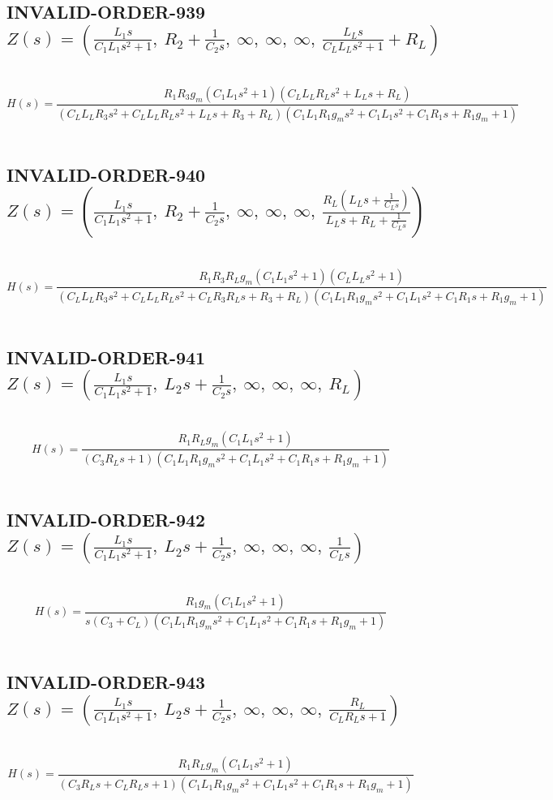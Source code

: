 \documentclass{article}
\begin{document}
\subsection{INVALID-ORDER-939 $Z(s) = \left( \frac{L_{1} s}{C_{1} L_{1} s^{2} + 1}, \  R_{2} + \frac{1}{C_{2} s}, \  \infty, \  \infty, \  \infty, \  \frac{L_{L} s}{C_{L} L_{L} s^{2} + 1} + R_{L}\right)$ } \ 
\textbf{\[H(s) = \frac{R_{1} R_{3} g_{m} \left(C_{1} L_{1} s^{2} + 1\right) \left(C_{L} L_{L} R_{L} s^{2} + L_{L} s + R_{L}\right)}{\left(C_{L} L_{L} R_{3} s^{2} + C_{L} L_{L} R_{L} s^{2} + L_{L} s + R_{3} + R_{L}\right) \left(C_{1} L_{1} R_{1} g_{m} s^{2} + C_{1} L_{1} s^{2} + C_{1} R_{1} s + R_{1} g_{m} + 1\right)}\] } \ 
\subsection{INVALID-ORDER-940 $Z(s) = \left( \frac{L_{1} s}{C_{1} L_{1} s^{2} + 1}, \  R_{2} + \frac{1}{C_{2} s}, \  \infty, \  \infty, \  \infty, \  \frac{R_{L} \left(L_{L} s + \frac{1}{C_{L} s}\right)}{L_{L} s + R_{L} + \frac{1}{C_{L} s}}\right)$ } \ 
\textbf{\[H(s) = \frac{R_{1} R_{3} R_{L} g_{m} \left(C_{1} L_{1} s^{2} + 1\right) \left(C_{L} L_{L} s^{2} + 1\right)}{\left(C_{L} L_{L} R_{3} s^{2} + C_{L} L_{L} R_{L} s^{2} + C_{L} R_{3} R_{L} s + R_{3} + R_{L}\right) \left(C_{1} L_{1} R_{1} g_{m} s^{2} + C_{1} L_{1} s^{2} + C_{1} R_{1} s + R_{1} g_{m} + 1\right)}\] } \ 
\subsection{INVALID-ORDER-941 $Z(s) = \left( \frac{L_{1} s}{C_{1} L_{1} s^{2} + 1}, \  L_{2} s + \frac{1}{C_{2} s}, \  \infty, \  \infty, \  \infty, \  R_{L}\right)$ } \ 
\textbf{\[H(s) = \frac{R_{1} R_{L} g_{m} \left(C_{1} L_{1} s^{2} + 1\right)}{\left(C_{3} R_{L} s + 1\right) \left(C_{1} L_{1} R_{1} g_{m} s^{2} + C_{1} L_{1} s^{2} + C_{1} R_{1} s + R_{1} g_{m} + 1\right)}\] } \ 
\subsection{INVALID-ORDER-942 $Z(s) = \left( \frac{L_{1} s}{C_{1} L_{1} s^{2} + 1}, \  L_{2} s + \frac{1}{C_{2} s}, \  \infty, \  \infty, \  \infty, \  \frac{1}{C_{L} s}\right)$ } \ 
\textbf{\[H(s) = \frac{R_{1} g_{m} \left(C_{1} L_{1} s^{2} + 1\right)}{s \left(C_{3} + C_{L}\right) \left(C_{1} L_{1} R_{1} g_{m} s^{2} + C_{1} L_{1} s^{2} + C_{1} R_{1} s + R_{1} g_{m} + 1\right)}\] } \ 
\subsection{INVALID-ORDER-943 $Z(s) = \left( \frac{L_{1} s}{C_{1} L_{1} s^{2} + 1}, \  L_{2} s + \frac{1}{C_{2} s}, \  \infty, \  \infty, \  \infty, \  \frac{R_{L}}{C_{L} R_{L} s + 1}\right)$ } \ 
\textbf{\[H(s) = \frac{R_{1} R_{L} g_{m} \left(C_{1} L_{1} s^{2} + 1\right)}{\left(C_{3} R_{L} s + C_{L} R_{L} s + 1\right) \left(C_{1} L_{1} R_{1} g_{m} s^{2} + C_{1} L_{1} s^{2} + C_{1} R_{1} s + R_{1} g_{m} + 1\right)}\] } \ 
\end{document}
